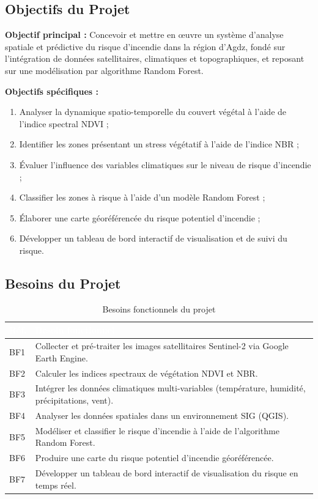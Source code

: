 \documentclass[12pt,a4paper]{report}
\begin{document}
\subsection{Objectifs du Projet}

\textbf{Objectif principal :} Concevoir et mettre en œuvre un système d'analyse spatiale et prédictive du risque d'incendie dans la région d'Agdz, fondé sur l'intégration de données satellitaires, climatiques et topographiques, et reposant sur une modélisation par algorithme Random Forest.

\textbf{Objectifs spécifiques :}
\begin{enumerate}
  \item Analyser la dynamique spatio-temporelle du couvert végétal à l'aide de l'indice spectral NDVI ;
  \item Identifier les zones présentant un stress végétatif à l'aide de l'indice NBR ;
  \item Évaluer l'influence des variables climatiques sur le niveau de risque d'incendie ;
  \item Classifier les zones à risque à l'aide d'un modèle Random Forest ;
  \item Élaborer une carte géoréférencée du risque potentiel d'incendie ;
  \item Développer un tableau de bord interactif de visualisation et de suivi du risque.
\end{enumerate}

\subsection{Besoins du Projet}

\begin{table}[H]
\centering
{}
\begin{tabularx}{\textwidth}{C{1.2cm} X}
\toprule
{}
\textcolor{white}{\textbf{Réf.}} & \textcolor{white}{\textbf{Besoin fonctionnel}} \\
\midrule
BF1 & Collecter et pré-traiter les images satellitaires Sentinel-2 via Google Earth Engine. \\
BF2 & Calculer les indices spectraux de végétation NDVI et NBR. \\
BF3 & Intégrer les données climatiques multi-variables (température, humidité, précipitations, vent). \\
BF4 & Analyser les données spatiales dans un environnement SIG (QGIS). \\
BF5 & Modéliser et classifier le risque d'incendie à l'aide de l'algorithme Random Forest. \\
BF6 & Produire une carte du risque potentiel d'incendie géoréférencée. \\
BF7 & Développer un tableau de bord interactif de visualisation du risque en temps réel. \\
\bottomrule
\end{tabularx}
\caption{Besoins fonctionnels du projet}
\label{tab:bf}
\end{table}
\end{document}
